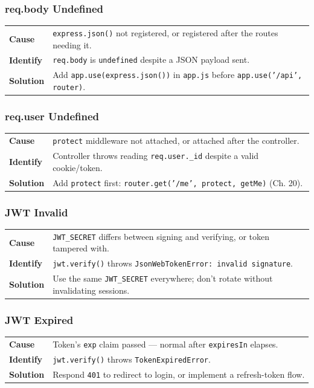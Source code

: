 \subsubsection*{req.body Undefined}
\noindent\begin{tabularx}{\textwidth}{@{}>{\bfseries}p{2.3cm}X@{}}
\toprule
Cause & \texttt{express.json()} not registered, or registered after the routes needing it. \\
Identify & \texttt{req.body} is \texttt{undefined} despite a JSON payload sent. \\
Solution & Add \texttt{app.use(express.json())} in \texttt{app.js} before \texttt{app.use('/api', router)}. \\
\bottomrule
\end{tabularx}

\subsubsection*{req.user Undefined}
\noindent\begin{tabularx}{\textwidth}{@{}>{\bfseries}p{2.3cm}X@{}}
\toprule
Cause & \texttt{protect} middleware not attached, or attached after the controller. \\
Identify & Controller throws reading \texttt{req.user.\_id} despite a valid cookie/token. \\
Solution & Add \texttt{protect} first: \texttt{router.get('/me', protect, getMe)} (Ch. 20). \\
\bottomrule
\end{tabularx}

\subsubsection*{JWT Invalid}
\noindent\begin{tabularx}{\textwidth}{@{}>{\bfseries}p{2.3cm}X@{}}
\toprule
Cause & \texttt{JWT\_SECRET} differs between signing and verifying, or token tampered with. \\
Identify & \texttt{jwt.verify()} throws \texttt{JsonWebTokenError: invalid signature}. \\
Solution & Use the same \texttt{JWT\_SECRET} everywhere; don't rotate without invalidating sessions. \\
\bottomrule
\end{tabularx}

\subsubsection*{JWT Expired}
\noindent\begin{tabularx}{\textwidth}{@{}>{\bfseries}p{2.3cm}X@{}}
\toprule
Cause & Token's \texttt{exp} claim passed --- normal after \texttt{expiresIn} elapses. \\
Identify & \texttt{jwt.verify()} throws \texttt{TokenExpiredError}. \\
Solution & Respond \texttt{401} to redirect to login, or implement a refresh-token flow. \\
\bottomrule
\end{tabularx}

